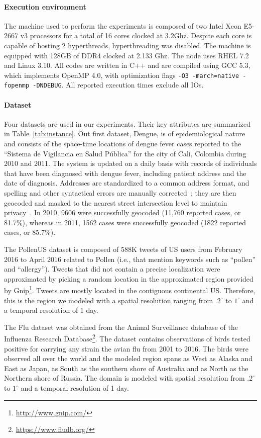 \documentclass{article}
\begin{document}
\paragraph{Execution environment} The machine used to perform the experiments is
composed of two Intel Xeon E5-2667 v3 processors for a total of
16 cores clocked at 3.2Ghz. Despite each core is capable of hosting 2
hyperthreads, hyperthreading was disabled. The machine is equipped with
128GB of DDR4 clocked at 2.133 Ghz. The node uses RHEL 7.2
and Linux 3.10. All codes are written in C++ and are compiled using GCC 5.3, which implements
OpenMP 4.0, with optimization flags \texttt{-O3 -march=native -fopenmp
  -DNDEBUG}. All reported execution times exclude all IOs.

\paragraph{Dataset} Four datasets are used in our experiments. Their
key attributes are summarized in Table~\ref{tab:instance}. 
Out first dataset, Dengue, is of epidemiological nature and consists of the space-time
locations of dengue fever cases reported to the “Sistema de Vigilancia
en Salud P\'{u}blica” for the city of Cali, Colombia during 2010 and 2011. The
system is updated on a daily basis with records of individuals that
have been diagnosed with dengue fever, including patient address and
the date of diagnosis. Addresses are standardized to a common address
format, and spelling and other syntactical errors are manually
corrected~\cite{delmelle2013spatio}; they are then geocoded and masked
to the nearest street intersection level to maintain
privacy~\cite{Kwan04}. In 2010, 9606 were successfully geocoded
(11,760 reported cases, or 81.7\%), whereas in 2011, 1562 cases were
successfully geocoded (1822 reported cases, or 85.7\%).

The PollenUS dataset is composed of 588K tweets of US users from
February 2016 to April 2016 related to Pollen (i.e., that mention
keywords such as ``pollen'' and ``allergy''). Tweets that did not
contain a precise localization were approximated by picking a random
location in the approximated region provided by
Gnip\footnote{\url{http://www.gnip.com/}}. Tweets are mostly located
in the contiguous continental US. Therefore, this is the region we
modeled with a spatial resolution ranging from $.2^\circ$ to $1^\circ$
and a temporal resolution of 1 day.

The Flu dataset was obtained from the Animal Surveillance
database of the Influenza Research
Database\footnote{\url{https://www.fludb.org/}}.
The dataset contains observations of birds tested positive for
carrying any strain the avian flu from 2001 to 2016. The birds were
observed all over the world and the modeled region spans as West as
Alaska and East as Japan, as South as the southern shore of Australia
and as North as the Northern shore of Russia. The domain is modeled
with spatial resolution from $.2^\circ$ to $1^\circ$ and a temporal
resolution of 1 day.
\end{document}
